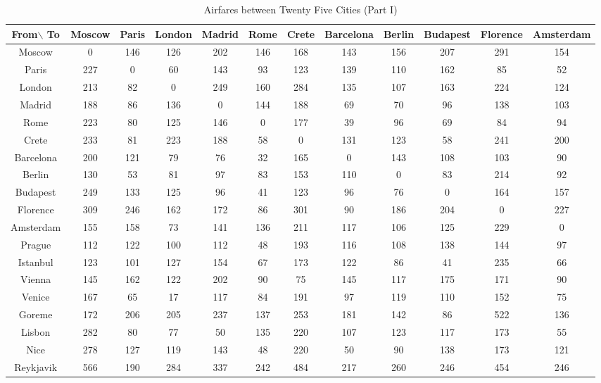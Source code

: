 \documentclass[12pt]{article}
\begin{document}
\begin{landscape}
\begin{table}[h]
\caption{Airfares between Twenty Five Cities (Part I)}
\centering
\vspace{1mm}
\begin{tabular}{c|c|c|c|c|c|c|c|c|c|c|c}
\hline
\rule{0pt}{2ex} From$\backslash$ To & Moscow & Paris & London & Madrid & Rome & Crete & Barcelona & Berlin & Budapest & Florence & Amsterdam   \\
\hline
\rule{0pt}{2ex}Moscow & 0 & 146 & 126 & 202 & 146 & 168 & 143 & 156 & 207 & 291 & 154 \\
Paris & 227 & 0 & 60 & 143 & 93 & 123 & 139 & 110 & 162 & 85 & 52  \\
London & 213 & 82 & 0 & 249 & 160 & 284 & 135 & 107 & 163 & 224 & 124  \\
Madrid & 188 & 86 & 136 & 0 & 144 & 188 & 69 & 70 & 96 & 138 & 103  \\
Rome & 223 & 80 & 125 & 146 & 0 & 177 & 39 & 96 & 69 & 84 & 94  \\
Crete & 233 & 81 & 223 & 188 & 58 & 0 & 131 & 123 & 58 & 241 & 200 \\
Barcelona & 200 & 121 & 79 & 76 & 32 & 165 & 0 & 143 & 108 & 103 & 90 \\
Berlin & 130 & 53 & 81 & 97 & 83 & 153 & 110 & 0 & 83 & 214 & 92 \\
Budapest & 249 & 133 & 125 & 96 & 41 & 123 & 96 & 76 & 0 & 164 & 157 \\
Florence & 309 & 246 & 162 & 172 & 86 & 301 & 90 & 186 & 204 & 0 & 227 \\
Amsterdam & 155 & 158 & 73 & 141 & 136 & 211 & 117 & 106 & 125 & 229 & 0 \\
Prague & 112 & 122 & 100 & 112 & 48 & 193 & 116 & 108 & 138 & 144 & 97 \\
Istanbul & 123 & 101 & 127 & 154 & 67 & 173 & 122 & 86 & 41 & 235 & 66 \\
Vienna & 145 & 162 & 122 & 202 & 90 & 75 & 145 & 117 & 175 & 171 & 90 \\
Venice & 167 & 65 & 17 & 117 & 84 & 191 & 97 & 119 & 110 & 152 & 75 \\
Goreme & 172 & 206 & 205 & 237 & 137 & 253 & 181 & 142 & 86 & 522 & 136 \\
Lisbon & 282 & 80 & 77 & 50 & 135 & 220 & 107 & 123 & 117 & 173 & 55 \\
Nice & 278 & 127 & 119 & 143 & 48 & 220 & 50 & 90 & 138 & 173 & 121 \\
Reykjavik & 566 & 190 & 284 & 337 & 242 & 484 & 217 & 260 & 246 & 454 & 246 \\

\end{tabular}
\end{table}
\end{landscape}
\end{document}
